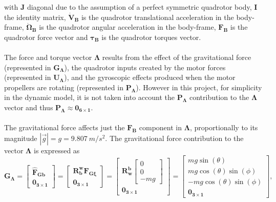 with $\mathbf{J}$ diagonal due to the assumption of a perfect symmetric quadrotor body, $\mathbf{I}$ the identity matrix, $\mathbf{\dot{V}_{B}}$ is the quadrotor translational acceleration in the body-frame, $\mathbf{\dot{\Omega}_B}$ is the quadrotor angular acceleration in the body-frame, $\mathbf{F_{B}}$ is the quadrotor force vector and $\mathbf{\tau_{B}}$ is the quadrotor torques vector.
\\\\
The force and torque vector $\mathbf{\Lambda}$ results from the effect of the gravitational force (represented in $\mathbf{G_{\Lambda}}$), the quadrotor inputs created by the motor forces (represented in $\mathbf{U_{\Lambda}}$), and the gyroscopic effects produced when the motor propellers are rotating (represented in $\mathbf{P_{\Lambda}}$). However in this project, for simplicity in the dynamic model, it is not taken into account the $\mathbf{P_{\Lambda}}$ contribution to the $\mathbf{\Lambda}$ vector and thus $\mathbf{P_{\Lambda}} \approx \mathbf{0_{6\times 1}}$.
\\\\
The gravitational force affects just the $\mathbf{F_B}$ component in $\mathbf{\Lambda}$, proportionally to its magnitude $|\vec{g}|= g = 9.807\ m/s^{2}$. The gravitational force contribution to the vector $\mathbf{\Lambda}$ is expressed as 
\begin{equation}
\mathbf{G_{\Lambda}}= \begin{bmatrix}
\mathbf{\hat{F}_{Gb}} \\ \mathbf{0_{3\times 1}}
\end{bmatrix} = \begin{bmatrix}
\mathbf{R_{b}^{w}}\mathbf{F_{G\xi}} \\ \mathbf{0_{3\times 1}}
\end{bmatrix} = 
\begin{bmatrix}
\mathbf{R_{w}^{b}} 
\begin{bmatrix}
0 \\[5pt] 0 \\[5pt] -m g
\end{bmatrix} \\[5pt]
\mathbf{0_{3\times 1}}
\end{bmatrix} =\begin{bmatrix}
m g \sin(\theta) \\[5pt]
m g \cos(\theta)\sin(\phi) \\[5pt]
- m g \cos(\theta)\sin(\phi) \\[5pt]
\mathbf{0_{3\times 1}}
\end{bmatrix},
\end{equation}
